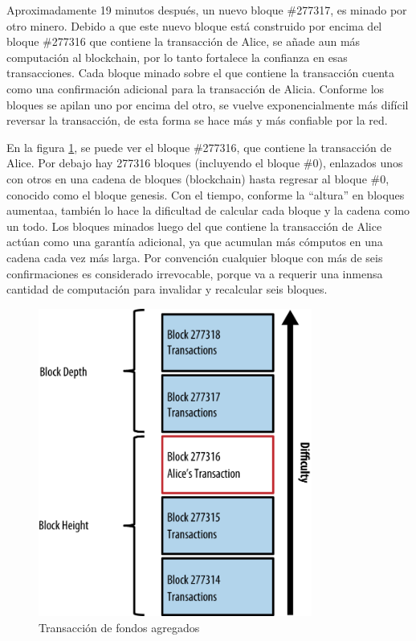 \documentclass[10pt,journal,compsoc]{IEEEtran}
\begin{document}
Aproximadamente 19 minutos después, un nuevo bloque \#277317, es minado por otro minero. Debido a que este nuevo bloque está construido por encima del bloque \#277316 que contiene la transacción de Alice, se añade aun más computación al blockchain, por lo tanto fortalece la confianza en esas transacciones. Cada bloque minado sobre el que contiene la transacción cuenta como una confirmación adicional para la transacción de Alicia. Conforme los bloques se apilan uno por encima del otro, se vuelve exponencialmente más difícil reversar la transacción, de esta forma se hace más y más confiable por la red.

En la figura \ref{fig:block}, se puede ver el bloque \#277316, que contiene la transacción de Alice. Por debajo hay 277316 bloques (incluyendo el bloque \#0), enlazados unos con otros en una cadena de bloques (blockchain) hasta regresar al bloque \#0, conocido como el bloque genesis. Con el tiempo, conforme la ``altura'' en bloques aumentaa, también lo hace la dificultad de calcular cada bloque y la cadena como un todo. Los bloques minados luego del que contiene la transacción de Alice actúan como una garantía adicional, ya que acumulan más cómputos en una cadena cada vez más larga. Por convención cualquier bloque con más de seis confirmaciones es considerado irrevocable, porque va a requerir una inmensa cantidad de computación para invalidar y recalcular seis bloques.

\begin{figure}[h]
    \center
    \includegraphics[width=9cm]{block}
    \caption{Transacción de fondos agregados}
    \label{fig:block}
\end{figure}
\end{document}
